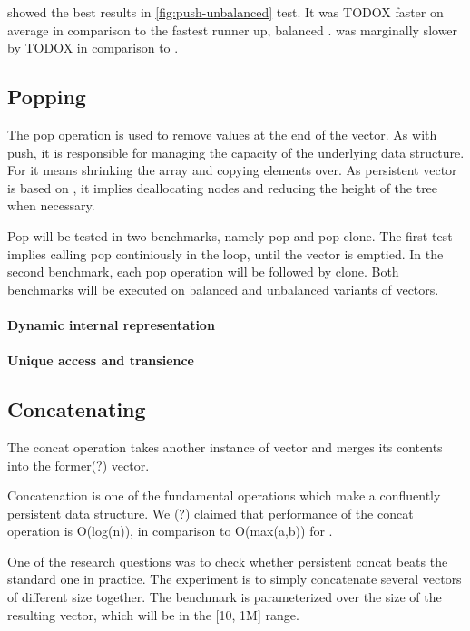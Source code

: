 \stdvec{} showed the best results in \ref{fig:push-unbalanced} test. It was TODOX faster on average in comparison to the fastest runner up, balanced \rrbvec{}. \imrsvec{} was marginally slower by TODOX in comparison to \pvec{}. 

\subsection{Popping}
The pop operation is used to remove values at the end of the vector. As with push, it is responsible for managing the capacity of the underlying data structure. For \stdvec{} it means shrinking the array and copying elements over. As persistent vector is based on \rrbtree{}, it implies deallocating nodes and reducing the height of the tree when necessary. 

Pop will be tested in two benchmarks, namely pop and pop clone. The first test implies calling pop continiously in the loop, until the vector is emptied. In the second benchmark, each pop operation will be followed by clone. Both benchmarks will be executed on balanced and unbalanced variants of vectors. 


\paragraph{Dynamic internal representation}

\paragraph{Unique access and transience}

\subsection{Concatenating}
The concat operation takes another instance of vector and merges its contents into the former(?) vector. 

Concatenation is one of the fundamental operations which make \rrbvec{} a confluently persistent data structure. We (?) claimed that performance of the concat operation is O(log(n)), in comparison to O(max(a,b)) for \stdvec{}. 

One of the research questions was to check whether persistent concat beats the standard one in practice. The experiment is to simply concatenate several vectors of different size together. The benchmark is parameterized over the size of the resulting vector, which will be in the [10, 1M] range. 


